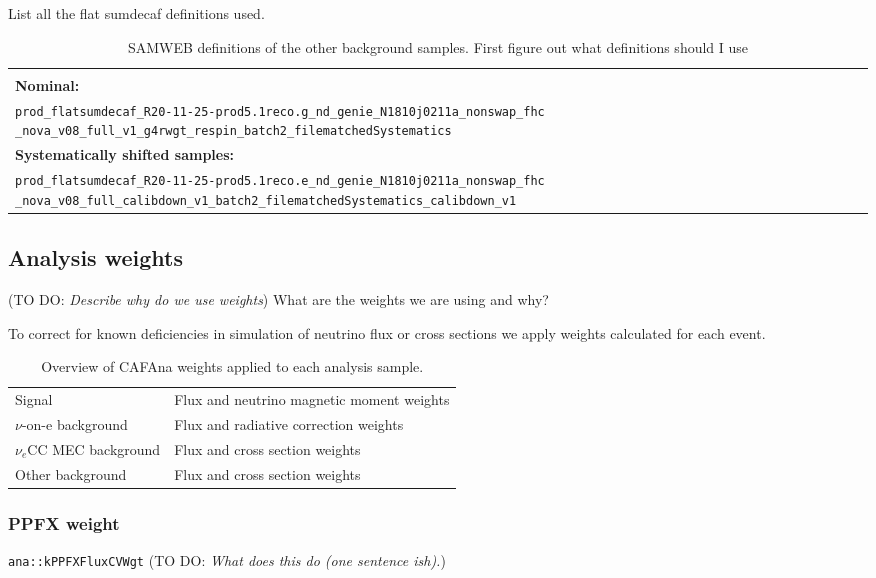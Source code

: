 \documentclass[12pt]{article}
\newcommand{\todo }[1]{({\color{red}\sc TO DO: \textit{#1}})}
\begin{document}
List all the flat sumdecaf definitions used.
\begin{table}[!ht]
\centering
\begin{tabular}{p{\textwidth}}
\hline\hline\\
\textbf{Nominal:}\\
\texttt{prod\_flatsumdecaf\_R20-11-25-prod5.1reco.g\_nd\_genie\_N1810j0211a\_nonswap\_fhc} \texttt{\_nova\_v08\_full\_v1\_g4rwgt\_respin\_batch2\_filematchedSystematics}\\[2mm]
\textbf{Systematically shifted samples:}\\
\texttt{prod\_flatsumdecaf\_R20-11-25-prod5.1reco.e\_nd\_genie\_N1810j0211a\_nonswap\_fhc} \texttt{\_nova\_v08\_full\_calibdown\_v1\_batch2\_filematchedSystematics\_calibdown\_v1}\\[2mm]
\hline\hline
\end{tabular}
\caption{SAMWEB definitions of the other background samples. First figure out what definitions should I use}
\label{tab:SumDeCAFDefinitions}
\end{table}

\subsection{Analysis weights}
\todo{Describe why do we use weights}
What are the weights we are using and why?

To correct for known deficiencies in simulation of neutrino flux or cross sections we apply weights calculated for each event.

\begin{table}[!ht]
\centering
\def\arraystretch{1.4}
\begin{tabular}{l@{\hskip 1in}l}
Signal                   & Flux and neutrino magnetic moment weights\\
$\nu$-on-e background    & Flux and radiative correction weights\\
$\nu_e$CC MEC background & Flux and cross section weights\\
Other background         & Flux and cross section weights
\end{tabular}
\caption{Overview of CAFAna weights applied to each analysis sample.}
\label{tab:WeightsOverview}
\end{table}

\subsubsection*{PPFX weight}
\texttt{ana::kPPFXFluxCVWgt} \cite{NOVA-doc-23441}
\todo{What does this do (one sentence ish).}
\end{document}
